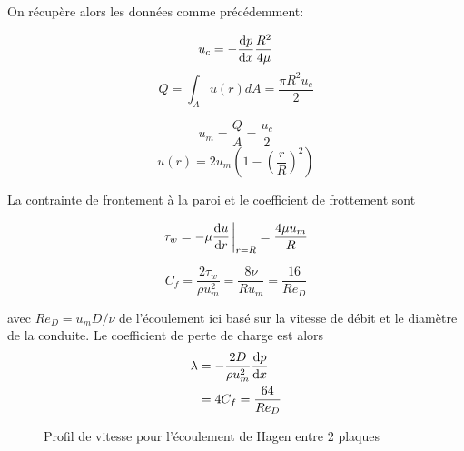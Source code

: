         On récupère alors les données comme précédemment:
        \begin{multicols}{2}
          \begin{equation*}
            u_c = -\dv{p}{x} \frac{R^2}{4\mu}
          \end{equation*}
          \begin{equation*}
            Q = \int_A u(r)dA = \frac{\pi R^2 u_c}{2}
          \end{equation*}

          \begin{equation*}
            u_m = \frac{Q}{A} = \frac{u_c}{2}
          \end{equation*}
          \begin{equation}
            u(r) = 2 u_m \left(1 - \left(\frac{r}{R}\right)^2\right)
          \end{equation}
        \end{multicols}
        La contrainte de frontement à la paroi et le coefficient de frottement sont
        \begin{multicols}{2}
          \begin{equation*}
            \tau_w = -\mu \dv{u}{r}\eval_{r=R} = \frac{4\mu u_m}{R}
          \end{equation*}

          \begin{equation*}
              C_f = \frac{2 \tau_w}{\rho u_m^2} = \frac{8\nu}{R u_m} = \frac{16}{Re_D}
          \end{equation*}
        \end{multicols}
        avec $Re_D = u_m D/\nu$ de l'écoulement ici basé sur la vitesse de débit et le diamètre de la conduite. Le coefficient de perte de charge est alors
        \begin{equation}
          \begin{aligned}
            \lambda &= - \frac{2D}{\rho u_m^2} \dv{p}{x}\\
            &= 4 C_f = \frac{64}{Re_D}
          \end{aligned}
        \end{equation}

        \begin{figure}[!h]
          \centering
          
          \label{fig:HagenProfile}
          \caption{Profil de vitesse pour l'écoulement de Hagen entre 2 plaques}
        \end{figure}

